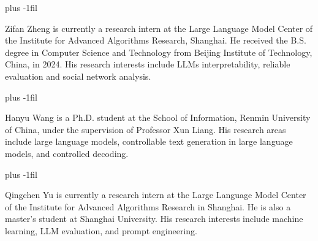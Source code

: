 \documentclass[lettersize,journal]{IEEEtran}
\begin{document}
\baselineskip plus -1fil

\begin{IEEEbiography}{Zifan Zheng}
is currently a research intern at the Large Language Model Center of the Institute for Advanced Algorithms Research, Shanghai. He received the B.S. degree in Computer Science and Technology from Beijing Institute of Technology, China, in 2024. His research interests include LLMs interpretability, reliable evaluation and social network analysis.
\end{IEEEbiography}

\baselineskip plus -1fil

\begin{IEEEbiography}{Hanyu Wang}
is a Ph.D. student at the School of Information, Renmin University of China, under the supervision of Professor Xun Liang. His research areas include large language models, controllable text generation in large language models, and controlled decoding.
\end{IEEEbiography}

\baselineskip plus -1fil

\begin{IEEEbiography}{Qingchen Yu}
is currently a research intern at the Large Language Model Center of the Institute for Advanced Algorithms Research in Shanghai. He is also a master's student at Shanghai University. His research interests include machine learning, LLM evaluation, and prompt engineering.
\end{IEEEbiography}
\end{document}
